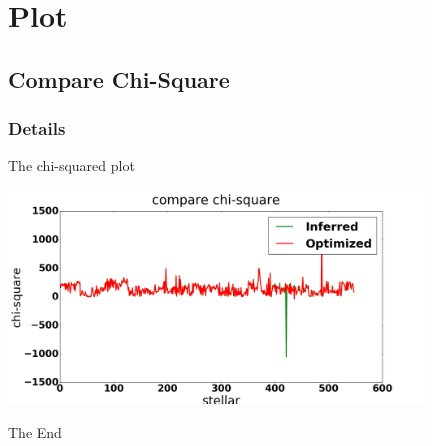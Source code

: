 \documentclass{beamer}
\begin{document}

\section{Plot} %

\subsection{Compare Chi-Square} %

\begin{frame}
\frametitle{Details}
 
The chi-squared plot

\includegraphics[width=110mm]{parameter.png}


\end{frame}



\begin{frame}
\Huge{\centerline{The End}}
\end{frame}

\end{document}
